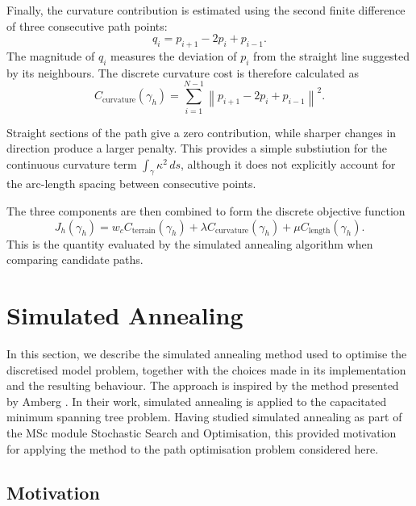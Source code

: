 Finally, the curvature contribution is estimated using the second finite difference of three consecutive path points:
\begin{equation}
q_i
=
p_{i+1}-2p_i+p_{i-1}.
\label{eq:curvature_difference}
\end{equation}
The magnitude of $q_i$ measures the deviation of $p_i$ from the
straight line suggested by its neighbours. The discrete curvature cost
is therefore calculated as
\begin{equation}
C_{\mathrm{curvature}}(\gamma_h)
=
\sum_{i=1}^{N-1}
\left\|
p_{i+1}-2p_i+p_{i-1}
\right\|^2.
\label{eq:discrete_curvature_cost}
\end{equation}

Straight sections of the path give a zero contribution, while sharper
changes in direction produce a larger penalty. This provides a simple
substiution for the continuous curvature term
$\int_\gamma \kappa^2\,ds$, although it does not explicitly account
for the arc-length spacing between consecutive points.

The three components are then combined to form the discrete objective
function
\begin{equation}
J_h(\gamma_h)
=
w_c C_{\mathrm{terrain}}(\gamma_h)
+
\lambda C_{\mathrm{curvature}}(\gamma_h)
+
\mu C_{\mathrm{length}}(\gamma_h).
\label{eq:discrete_total_cost}
\end{equation}
This is the quantity evaluated by the simulated annealing algorithm
when comparing candidate paths.


\section{Simulated Annealing}

In this section, we describe the simulated annealing method used to optimise the discretised model problem, together with the choices made in its implementation and the resulting behaviour. The approach is inspired by the method presented by Amberg \cite{AmbergDomschekeVo}. In their work, simulated annealing is applied to the capacitated minimum spanning tree problem. Having studied simulated annealing as part of the MSc module Stochastic Search and Optimisation, this provided motivation for applying the method to the path optimisation problem considered here.

\subsection{Motivation}

